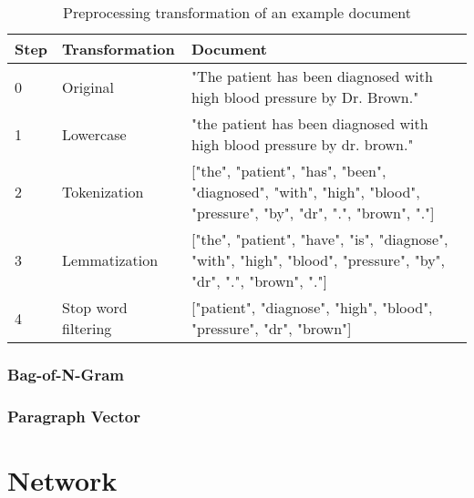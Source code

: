 \begin{table}[]
	\begin{tabularx}{\textwidth}{l l p{9.8cm}}
		\toprule
		\textbf{Step} & \textbf{Transformation} & \textbf{Document}                                                       \\ \midrule
		0             & Original       & "The patient has been diagnosed with high blood pressure by Dr. Brown." \\
		1             & Lowercase               & "the patient has been diagnosed with high blood pressure by dr. brown." \\
		2 & Tokenization  & {[}"the", "patient", "has", "been", "diagnosed", "with", "high", "blood", "pressure", "by", "dr", ".", "brown", "."{]} \\
		3 & Lemmatization & {[}"the", "patient", "have", "is", "diagnose", "with", "high", "blood", "pressure", "by", "dr", ".", "brown", "."{]}   \\
		4             & Stop word filtering     & {[}"patient", "diagnose", "high", "blood", "pressure", "dr", "brown"{]} \\ \bottomrule
	\end{tabularx}
	\caption{Preprocessing transformation of an example document}
	\label{tab:text-preprocessing}
\end{table}








\subsubsection{Bag-of-N-Gram}
\subsubsection{Paragraph Vector}

\section{Network}